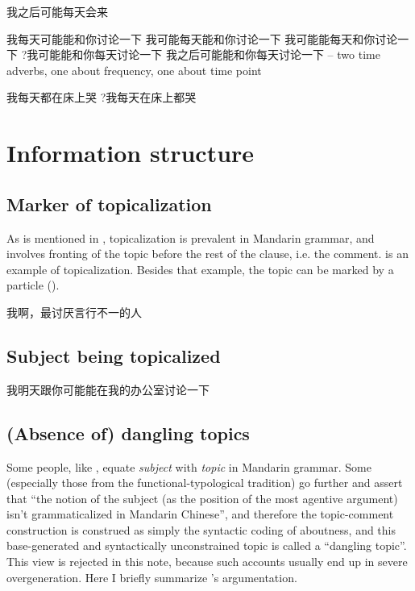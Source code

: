 \documentclass[UTF8, a4paper, oneside, scheme=plain, 12pt]{ctexrep}
\newcommand*{\citesec}[1]{\S~{#1}}
\newcommand*{\term}[1]{\emph{#1}}
\begin{document}
\begin{exe}
    \ex 我之后可能每天会来 

    \ex *我每天可能能和你讨论一下
    \ex 我可能每天能和你讨论一下 
    \ex 我可能能每天和你讨论一下 
    \ex ?我可能能和你每天讨论一下
    \ex 我之后可能能和你每天讨论一下 -- two time adverbs, one about frequency, one about time point 
\end{exe}

\begin{exe}
    \ex 我每天都在床上哭
    \ex ?我每天在床上都哭
\end{exe}

\chapter{Information structure}

\section{Marker of topicalization}


As is mentioned in ,
topicalization is prevalent in Mandarin grammar,
and involves fronting of the topic before the rest of the clause, i.e. the comment.
 is an example of topicalization.
Besides that example, the topic can be marked by a particle
().

\begin{exe}
    \ex\label{ex:information.topic.marker.1} 我啊，最讨厌言行不一的人
\end{exe}

\section{Subject being topicalized}\label{sec:topic.subject}

\begin{exe}
    \ex 我明天跟你可能能在我的办公室讨论一下
\end{exe}

\section{(Absence of) dangling topics}\label{sec:topic-subject}

Some people, like \citet[\citesec{7.1}]{zhudexigrammar},
equate \term{subject} with \term{topic} in Mandarin grammar.
Some (especially those from the functional-typological tradition) go further 
and assert that ``the notion of the subject (as the position of the most agentive argument) 
isn't grammaticalized in Mandarin Chinese'',
and therefore the topic-comment construction 
is construed as simply the syntactic coding of aboutness,
and this base-generated and syntactically unconstrained topic 
is called a ``dangling topic''.
This view is rejected in this note,
because such accounts usually end up in severe overgeneration. 
Here I briefly summarize \citet{sih2000topic}'s argumentation.
\end{document}

